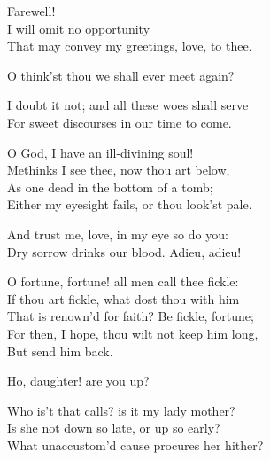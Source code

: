 \begin{speech}
Farewell! \\
I will omit no opportunity \\
That may convey my greetings, love, to thee. \\
\end{speech}
\begin{speech}
O think'st thou we shall ever meet again? \\
\end{speech}
\begin{speech}
I doubt it not; and all these woes shall serve \\

For sweet discourses in our time to come. \\
\end{speech}
\begin{speech}
O God, I have an ill-divining soul! \\
Methinks I see thee, now thou art below, \\
As one dead in the bottom of a tomb; \\
Either my eyesight fails, or thou look'st pale. \\
\end{speech}
\begin{speech}
And trust me, love, in my eye so do you: \\
Dry sorrow drinks our blood. Adieu, adieu!  \\

\end{speech}
\begin{speech}
O fortune, fortune! all men call thee fickle: \\
If thou art fickle, what dost thou with him \\
That is renown'd for faith?   Be fickle, fortune; \\
For then, I hope, thou wilt not keep him long, \\
But send him back. \\
\end{speech}
\begin{speech}
 Ho, daughter! are you up? \\

\end{speech}
\begin{speech}
Who is't that calls? is it my lady mother? \\
Is she not down so late, or up so early? \\
What unaccustom'd cause procures her hither? 
\\
\end{speech}
